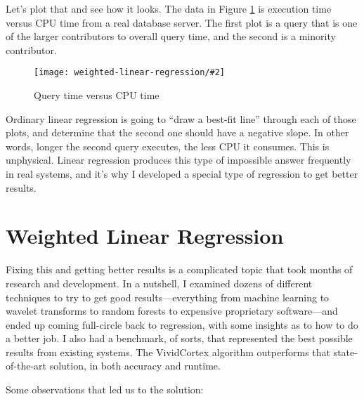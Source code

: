 \documentclass{vivid_layout}
\newcommand{\myfig}[3]{
	\begin{figure}[!htpb]
	\begin{center}
	\rule{0mm}{5mm}
	\texttt{[image: weighted-linear-regression/\#2]}
	\caption{#3}\label{fig:#2}
	\end{center}
	\end{figure}
}
\begin{document}
Let's plot that and see how it looks. The data in Figure \ref{fig:queries-vs-user_us} is execution time versus CPU time from a real database server. The first plot is a query that is one of the larger contributors to overall query time, and the second is a minority contributor.

\myfig{\textwidth}{queries-vs-user_us}{Query time versus CPU time}

Ordinary linear regression is going to ``draw a best-fit line'' through each of those plots, and determine that the second one should have a negative slope. In other words, longer the second query executes, the less CPU it consumes. This is unphysical. Linear regression produces this type of impossible answer frequently in real systems, and it's why I developed a special type of regression to get better results.

\section{Weighted Linear Regression}

Fixing this and getting better results is a complicated topic that took months of research and development. In a nutshell, I examined dozens of different techniques to try to get good results---everything from machine learning to wavelet transforms to random forests to expensive proprietary software---and ended up coming full-circle back to regression, with some insights as to how to do a better job. I also had a benchmark, of sorts, that represented the best possible results from existing systems. The VividCortex algorithm outperforms that state-of-the-art solution, in both accuracy and runtime.

Some observations that led us to the solution:
\end{document}
